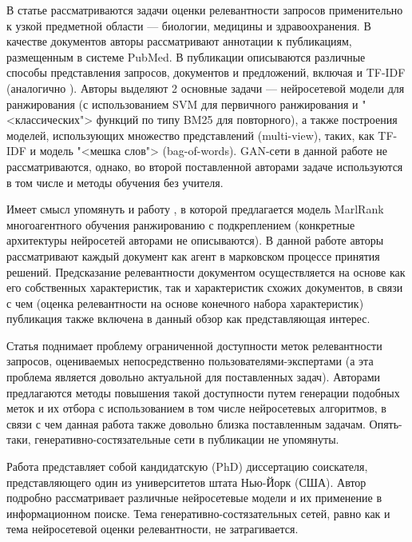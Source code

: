 В статье \cite{DBLP:journals/corr/abs-1910-00314} рассматриваются задачи оценки релевантности запросов применительно к узкой
предметной области --- биологии, медицины и здравоохранения. В качестве документов авторы рассматривают аннотации к публикациям,
размещенным в системе PubMed. В публикации описываются различные способы представления запросов, документов и предложений, включая
и TF-IDF (аналогично \cite{DBLP:journals/corr/abs-2001-09896}). Авторы выделяют 2 основные задачи --- нейросетевой модели для
ранжирования (с использованием SVM для первичного ранжирования и "<классических"> функций по типу BM25 для повторного), а также
построения моделей, использующих множество представлений (multi-view), таких, как TF-IDF и модель "<мешка слов"> (bag-of-words).
GAN-сети в данной работе не рассматриваются, однако, во второй поставленной авторами задаче используются в том числе и методы
обучения без учителя.

Имеет смысл упомянуть и работу \cite{DBLP:journals/corr/abs-1909-06859}, в которой предлагается модель MarlRank многоагентного
обучения ранжированию с подкреплением (конкретные архитектуры нейросетей авторами не описываются). В данной работе авторы 
рассматривают каждый документ как агент в марковском процессе принятия решений. Предсказание релевантности документом 
осуществляется на основе как его собственных характеристик, так и характеристик схожих документов, в связи с чем (оценка 
релевантности на основе конечного набора характеристик) публикация также включена в данный обзор как представляющая интерес. 

Статья \cite{DBLP:journals/corr/abs-1907-08657} поднимает проблему ограниченной доступности меток релевантности запросов,
оцениваемых непосредственно пользователями-экспертами (а эта проблема является довольно актуальной для поставленных задач).
Авторами предлагаются методы повышения такой доступности путем генерации подобных меток и их отбора с использованием в 
том числе нейросетевых алгоритмов, в связи с чем данная работа также довольно близка поставленным задачам. Опять-таки, 
генеративно-состя\-зательные сети в публикации не упомянуты.

Работа \cite{DBLP:journals/corr/abs-1908-06132} представляет собой кандидатскую (PhD) диссертацию соискателя, представляющего
один из университетов штата Нью-Йорк (США). Автор подробно рассматривает различные нейросетевые модели и их применение в информационном
поиске. Тема генеративно-состязательных сетей, равно как и тема нейросетевой оценки релевантности, не затрагивается.


